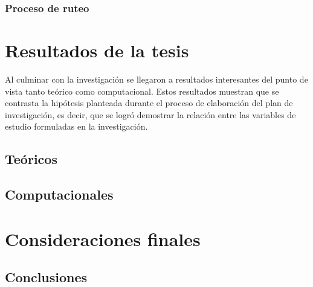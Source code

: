 \subsection{Proceso de ruteo}



\chapter{Resultados de la tesis}


Al culminar con la investigación se llegaron a resultados interesantes del punto de vista tanto teórico como computacional. Estos resultados muestran que se contrasta la hipótesis planteada durante el proceso de elaboración del plan de investigación, es decir, que se logró demostrar la relación entre las variables de estudio formuladas en la investigación.

\section{Teóricos}
\section{Computacionales}




\chapter{Consideraciones finales}



\section{Conclusiones}

